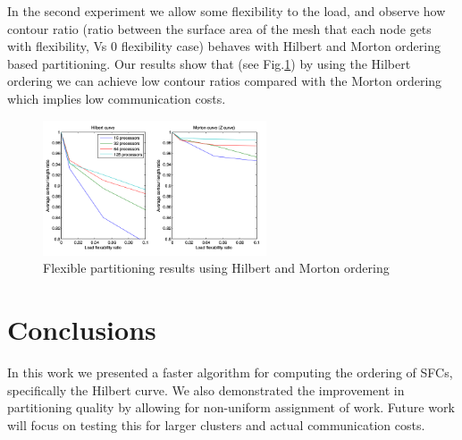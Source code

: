 \documentclass{sig-alternate}
\begin{document}
In the second experiment we allow some flexibility to the load, and observe how contour ratio (ratio between the surface area of the mesh that each node gets with flexibility, Vs 0 flexibility case)
behaves with Hilbert and Morton ordering based partitioning. Our results show that (see Fig.\ref{flexibility}) by using the Hilbert ordering we can achieve low contour ratios compared with the Morton ordering which implies low
communication costs.

\begin{figure}[H]
\centering
\includegraphics[height=4cm,keepaspectratio]{images/flexibility.png}
\caption{ Flexible partitioning results using Hilbert and Morton ordering \label{flexibility}}
\end{figure}

\section*{Conclusions}

In this work we presented a faster algorithm for computing the ordering of SFCs, specifically the Hilbert curve. We also demonstrated the improvement in partitioning quality by allowing for non-uniform assignment of work. Future work will focus on testing this for larger clusters and actual communication costs. 






 
\end{document}
